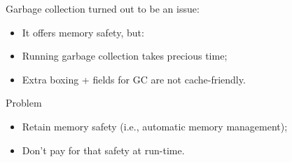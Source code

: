 \documentclass[9pt]{beamer}
\renewcommand\big[1]{
  \begin{center}
    \Large{#1}
  \end{center}
}
\begin{document}
\begin{frame}
  \big{Garbage collection turned out to be an issue:}
  \begin{itemize}
    \item It offers memory safety, but:
    \item Running garbage collection takes precious time;
    \item Extra boxing + fields for GC are not cache-friendly.
  \end{itemize}
\end{frame}

\begin{frame}
  \big{Problem}
  \begin{itemize}
    \item Retain memory safety (i.e., automatic memory management);
    \item Don't pay for that safety at run-time.
  \end{itemize}
\end{frame}
\end{document}
